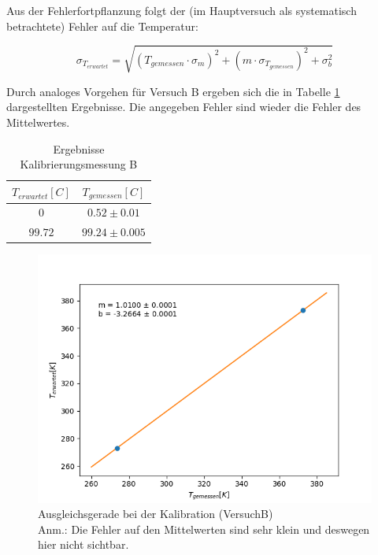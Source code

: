 \documentclass[12pt,a4paper]{article}
\begin{document}
Aus der Fehlerfortpflanzung folgt der (im Hauptversuch als systematisch betrachtete) Fehler auf die Temperatur:

\begin{equation}
\sigma_{T_{erwartet}} = \sqrt{(T_{gemessen} \cdot \sigma_m)^2 + (m \cdot \sigma_{T_{gemessen}})^2 + \sigma_b^2}
\end{equation}

Durch analoges Vorgehen für Versuch B ergeben sich die in Tabelle \ref{tab:KaliB} dargestellten Ergebnisse. Die angegeben Fehler sind wieder die Fehler des Mittelwertes.


\begin{table}[H]
\begin{center}
\begin{tabular}{|c|c|}
\hline 
$T_{erwartet}[C]$ & $T_{gemessen}[C]$ \\ 
\hline 
$0$ & $0.52 \pm 0.01$ \\ 
\hline 
$99.72$ & $99.24\pm 0.005$ \\ %
\hline 
\end{tabular}
\caption[Ergebnisse Kalibrierungsmessung B]{Ergebnisse Kalibrierungsmessung B}
\label{tab:KaliB}
\end{center}
\end{table}


\begin{figure}[H]
\centering
\includegraphics[width=0.9\linewidth]{Bilder/KalibrationB}
\begin{center}
\caption[KalibrationB]{Ausgleichsgerade bei der Kalibration (VersuchB)\\
Anm.: Die Fehler auf den Mittelwerten sind sehr klein und deswegen hier nicht sichtbar.}
\label{fig:GeradeKaliB}
\end{center}
\end{figure}
\end{document}
